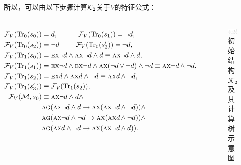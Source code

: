 \documentclass[9pt, CJK]{beamer}
\begin{document}
\begin{frame}
{{{\begin{example}
			所以，可以由以下步骤计算${\cal K}_2$关于$V$的特征公式：
			\begin{columns}
					\begin{align*}
					{\cal F}_V(\textrm{Tr}_0(s_0)) &= d, \qquad \quad {\cal F}_V(\textrm{Tr}_0(s_1)) = \neg d, \\
					{\cal F}_V(\textrm{Tr}_0(s_2)) &= \neg d,  \qquad  {\cal F}_V(\textrm{Tr}_0(s_3')) = \neg d,\\
					{\cal F}_V(\textrm{Tr}_1(s_0)) &= \textsc{e}\textsc{x} \neg d \wedge \textsc{a}\textsc{x} \neg d \wedge d \equiv \textsc{a}\textsc{x} \neg d \wedge d, \\
					{\cal F}_V(\textrm{Tr}_1(s_1)) &= \textsc{e}\textsc{x} \neg d \wedge \textsc{e}\textsc{x} \neg d  \wedge \textsc{a}\textsc{x} (\neg d \vee \neg d) \wedge \neg d 
					\equiv \textsc{a}\textsc{x} \neg d \wedge \neg d, \\
					{\cal F}_V(\textrm{Tr}_1(s_2)) &= \textsc{e}\textsc{x} d  \wedge \textsc{a}\textsc{x} d \wedge \neg d \equiv \textsc{a}\textsc{x} d \wedge \neg d,\\
					{\cal F}_V(\textrm{Tr}_1(s_3')) &\equiv {\cal F}_V(\textrm{Tr}_1(s_2)),\\
					{\cal F}_V({\cal M}, s_0)&\equiv \textsc{a}\textsc{x} \neg d \wedge d \wedge \\
					& \textsc{a} \textsc{g}(\textsc{a}\textsc{x} \neg d \wedge d \rightarrow \textsc{a}\textsc{x}(\textsc{a}\textsc{x} \neg d \wedge \neg d))\wedge \\
					& \textsc{a} \textsc{g}(\textsc{a}\textsc{x} \neg d \wedge \neg d \rightarrow \textsc{a}\textsc{x}(\textsc{a}\textsc{x} d \wedge \neg d)) \wedge\\
					& \textsc{a} \textsc{g}(\textsc{a}\textsc{x} d \wedge \neg d \rightarrow \textsc{a}\textsc{x}(\textsc{a}\textsc{x} \neg d \wedge d)).
				\end{align*}
				\begin{figure}
					\includegraphics[scale=0.25]{figures/NK2Tree2}
					\caption{{\tiny 初始结构$\mathcal{K}_2$及其计算树示意图}}\label{fig:K2Tree}
				\end{figure}
			\end{columns} 
		\end{example}
	}
} 
	}
\end{frame}
\end{document}
